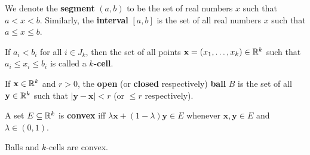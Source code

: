 \begin{definition}
We denote the \textbf{segment} $(a, b)$ to be the set of real numbers $x$ such that $a < x < b$. Similarly, the \textbf{interval} $[a, b]$ is the set of all real numbers $x$ such that $a \le x \le b$. 

If $a_i < b_i$ for all $i \in J_k$, then the set of all points $\textbf{x} = (x_1, \dotsc, x_k) \in \mathbb{R}^k$ such that $a_i \le x_i \le b_i$ is called a \textbf{$k$-cell}.

If $\textbf{x} \in \mathbb{R}^k$ and $r > 0$, the \textbf{open} (or \textbf{closed} respectively) \textbf{ball} $B$ is the set of all $\textbf{y} \in \mathbb{R}^k$ such that $|\textbf{y} - \textbf{x}| < r$ (or $\le r$ respectively).

A set $E \subseteq \mathbb{R}^k$ is \textbf{convex} iff $\lambda \textbf{x} + (1 - \lambda) \textbf{y} \in E$ whenever $\textbf{x}, \textbf{y} \in E$ and $\lambda \in (0, 1)$.

Balls and $k$-cells are convex.  
\end{definition}

